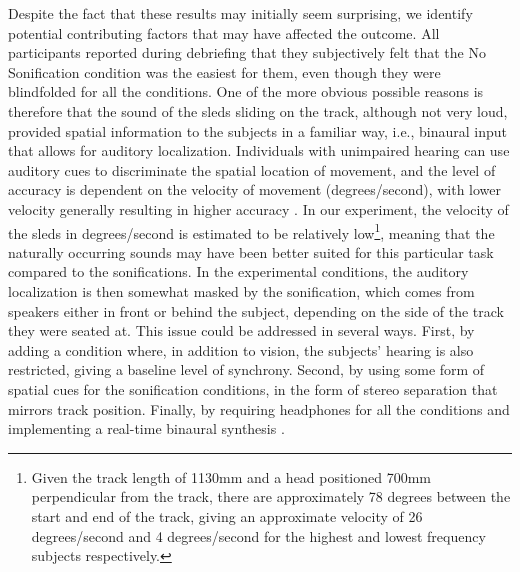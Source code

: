 \documentclass[10pt,a4paper,onecolumn]{article}
\begin{document}
Despite the fact that these results may initially seem surprising, we identify potential contributing factors that may have affected the outcome. All participants reported during debriefing that they subjectively felt that the No Sonification condition was the easiest for them, even though they were blindfolded for all the conditions. One of the more obvious possible reasons is therefore that the sound of the sleds sliding on the track, although not very loud, provided spatial information to the subjects in a familiar way, i.e., binaural input that allows for auditory localization. Individuals with unimpaired hearing can use auditory cues to discriminate the spatial location of movement, and the level of accuracy is dependent on the velocity of movement (degrees/second), with lower velocity generally resulting in higher accuracy \autocite{carlilePerceptionAuditoryMotion2016}. In our experiment, the velocity of the sleds in degrees/second is estimated to be relatively low\footnote{Given the track length of 1130mm and a head positioned 700mm perpendicular from the track, there are approximately 78 degrees between the start and end of the track, giving an approximate velocity of 26 degrees/second and 4 degrees/second for the highest and lowest frequency subjects respectively.}, meaning that the naturally occurring sounds may have been better suited for this particular task compared to the sonifications. In the experimental conditions, the auditory localization is then somewhat masked by the sonification, which comes from speakers either in front or behind the subject, depending on the side of the track they were seated at. This issue could be addressed in several ways. First, by adding a condition where, in addition to vision, the subjects' hearing is also restricted, giving a baseline level of synchrony. Second, by using some form of spatial cues for the sonification conditions, in the form of stereo separation that mirrors track position. Finally, by requiring headphones for all the conditions and implementing a real-time binaural synthesis \autocite{tommasiniComputationalModelImplement2019}.
\end{document}
